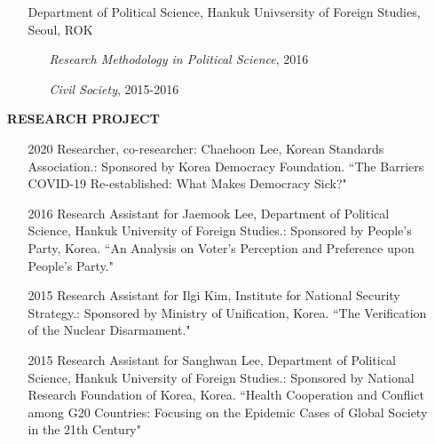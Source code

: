 \documentclass[11pt]{res} %
\begin{document}
\begin{resume}
\begin{itemize}[leftmargin=*]
\begin{itemize}[leftmargin=*]
		\item[] Department of Political Science, Hankuk Univsersity of Foreign Studies, Seoul, ROK
		\begin{itemize}[leftmargin=*]
			\setlength\itemsep{-0.2em}
			\item[] \textit{Research Methodology in Political Science}, 2016
			\item[] \textit{Civil Society}, 2015-2016
		\end{itemize}
	\end{itemize}
	\item[] \textbf{RESEARCH PROJECT}
	 \begin{itemize}
 		\item[2020] Researcher, co-researcher: Chaehoon Lee, Korean Standards Association.: Sponsored by Korea Democracy Foundation. ``The Barriers COVID-19 Re-established: What Makes Democracy Sick?"
		\item[2016] Research Assistant for Jaemook Lee, Department of Political Science, Hankuk University of Foreign Studies.: Sponsored by People's Party, Korea. ``An Analysis on Voter’s Perception and Preference upon People’s Party."
		\item[2015] Research Assistant for Ilgi Kim, Institute for National Security Strategy.: Sponsored by Ministry of Unification, Korea. ``The Verification of the Nuclear Disarmament."
		\item[2015] Research Assistant for Sanghwan Lee, Department of Political Science, Hankuk University of Foreign Studies.: Sponsored by National Research Foundation of Korea, Korea. ``Health Cooperation and Conflict among G20 Countries: Focusing on the Epidemic Cases of Global Society in the 21th Century"
	\end{itemize}		
\end{itemize}
 

\end{resume}
\end{document}
